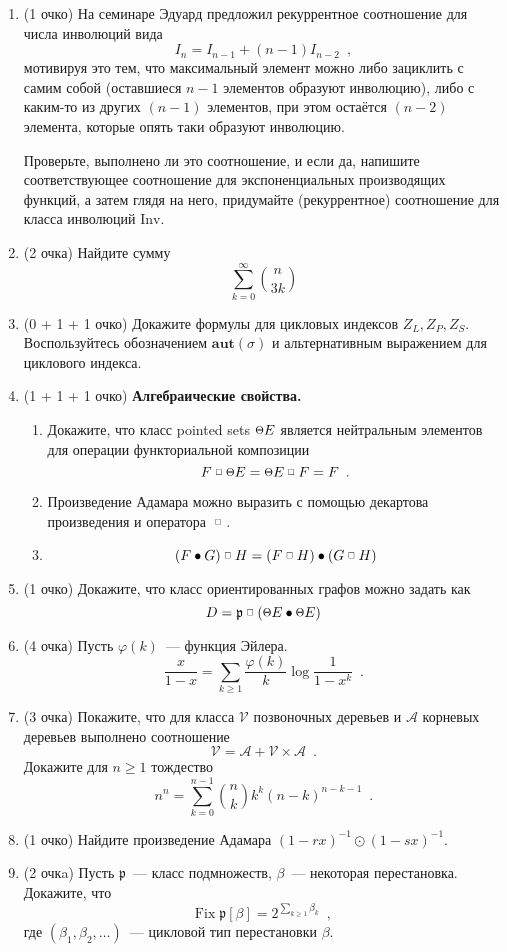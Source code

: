 \documentclass[a5paper]{article}
\def \fprod {\; \raisebox{.3\height}{\scalebox{0.6}{$\square$}}\; }
\def \point {\raisebox{.1\height}{\scalebox{0.8}{$\Theta$}}}
\theoremstyle{definition}
\begin{document}
\begin{enumerate}
	\item(1 очко) На семинаре Эдуард предложил рекуррентное 
	соотношение для числа инволюций вида
	\[
		I_{n} = I_{n-1} + (n-1)I_{n-2} \enspace ,
	\]
	мотивируя это тем, 
	что 
	максимальный элемент можно либо зациклить с самим собой (оставшиеся \( n-1 
	\) 
	элементов образуют инволюцию), либо с каким-то из других \( (n-1) \) 
	элементов, 
	при этом остаётся \( (n-2) \) элемента, которые опять таки образуют 
	инволюцию.
	
	Проверьте, выполнено ли это соотношение, и если да, напишите 
	соответствующее 
	соотношение для экспоненциальных производящих функций, а затем глядя на 
	него, 
	придумайте (рекуррентное) соотношение для класса инволюций \( \mathrm{Inv} 
	\).
    \item(2 очка) Найдите сумму 
    \[
        \sum_{k = 0}^{\infty} {n \choose 3k}
    \]

	\item(0 + 1 + 1 очко) Докажите формулы для цикловых индексов \( Z_L, Z_P,
Z_S \). Воспользуйтесь обозначением \( \mathbf{aut}(\sigma) \) и альтернативным
выражением для циклового индекса.
	\item(1 + 1 + 1 очко) \textbf{Алгебраические свойства.}
        \begin{enumerate}
        \item	Докажите, что класс pointed sets \( \point E \) является 
        нейтральным элементов для операции функториальной композиции
        \[
            F \fprod \point E = \point E \fprod F = F \enspace .
        \]
        \item Произведение Адамара можно выразить с помощью декартова произведения 
        и оператора \( \fprod \).
        \item 
\[
	(F \bullet G) \fprod H = (F \fprod H) \bullet (G \fprod H)
\]
        \end{enumerate}
	\item(1 очко) Докажите, что класс ориентированных графов можно задать как 
	\[
		D = \mathfrak p \fprod (\point E \bullet \point E)
	\]
    \item(4 очка) Пусть \( \varphi(k) \)~--- функция Эйлера.
\[
    \dfrac{x}{1-x} = \sum_{k \geq 1} \dfrac{\varphi(k)}{k} \log \dfrac{1}{1 -
x^k} \enspace.
\]
	\item(3 очка) Покажите, что для класса \( \mathcal V \) позвоночных деревьев
и \( \mathcal A \) корневых деревьев выполнено соотношение
\[
    \mathcal V = \mathcal A + \mathcal V \times \mathcal A \enspace .
\]
Докажите для \( n \geq 1 \) тождество 
\[
    n^n = \sum_{k = 0}^{n-1} {n \choose k} k^k (n-k)^{n-k-1} \enspace .
\]
    \item(1 очко) Найдите произведение Адамара \( (1 - rx)^{-1} \odot (1 - sx)^{-1}\).
    \item(2 очкa) Пусть \( \mathfrak p \)~--- класс подмножеств, \( \beta\)~---
некоторая перестановка. Докажите, что
    \[
    \mathrm{Fix}\; \mathfrak p [\beta] = 2^{\sum_{k \geq 1} \beta_k} \enspace ,
    \]
где $(\beta_1, \beta_2, \ldots)$~--- цикловой тип перестановки \( \beta \).
\end{enumerate}

\footnotesize


    
\end{document}
